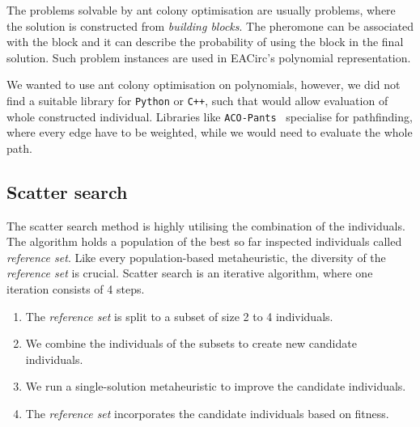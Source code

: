 \documentclass[
  print, %
  Table,   %
  nolof,     %
  nolot,     %
  11pt, %
  oneside  %
]{fithesis3}
\begin{document}
The problems solvable by ant colony optimisation are usually problems, where the solution is constructed from \textit{building blocks}. The pheromone can be associated with the block and it can describe the probability of using the block in the final solution. Such problem instances are used in EACirc's polynomial representation.

We wanted to use ant colony optimisation on polynomials, however, we did not find a suitable library for \texttt{Python} or \texttt{C++}, such that would allow evaluation of whole constructed individual. Libraries like \texttt{ACO-Pants}~\cite{acoPants} specialise for pathfinding, where every edge have to be weighted, while we would need to evaluate the whole path.

\subsection{Scatter search}
\label{subsec:opt-popul-scatter}

The scatter search method is highly utilising the combination of the individuals. The algorithm holds a population of the best so far inspected individuals called \textit{reference set}. Like every population-based metaheuristic, the diversity of the \textit{reference set} is crucial. Scatter search is an iterative algorithm, where one iteration consists of 4 steps.

\begin{enumerate}
    \item The \textit{reference set} is split to a subset of size 2 to 4 individuals.
    \item We combine the individuals of the subsets to create new candidate individuals.
    \item We run a single-solution metaheuristic to improve the candidate individuals.
    \item The \textit{reference set} incorporates the candidate individuals based on fitness.
\end{enumerate}
\end{document}
